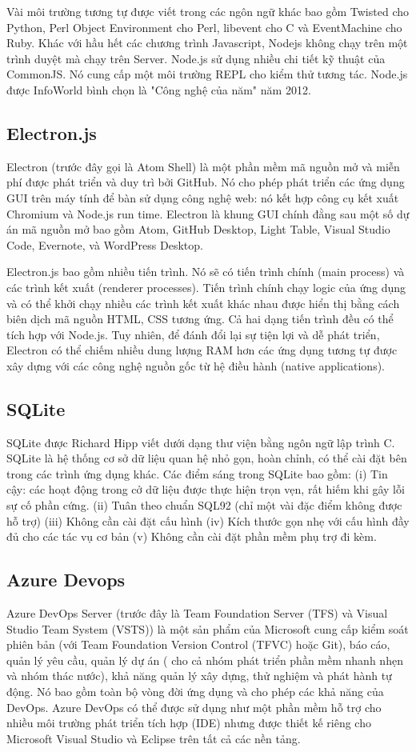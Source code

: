 \documentclass[12pt]{report}
\begin{document}
Vài môi trường tương tự được viết trong các ngôn ngữ khác bao gồm Twisted cho Python, Perl Object Environment cho Perl, libevent cho C và EventMachine cho Ruby. Khác với hầu hết các chương trình Javascript, Nodejs không chạy trên một trình duyệt mà chạy trên Server. Node.js sử dụng nhiều chi tiết kỹ thuật của CommonJS. Nó cung cấp một môi trường REPL cho kiểm thử tương tác. Node.js được InfoWorld bình chọn là "Công nghệ của năm" năm 2012.
\subsection{Electron.js}
Electron (trước đây gọi là Atom Shell) là một phần mềm mã nguồn mở và miễn phí được phát triển và duy trì bởi GitHub. Nó cho phép phát triển các ứng dụng GUI trên máy tính để bàn sử dụng công nghệ web: nó kết hợp công cụ kết xuất Chromium và Node.js run time. Electron là khung GUI chính đằng sau một số dự án mã nguồn mở bao gồm Atom, GitHub Desktop, Light Table, Visual Studio Code, Evernote, và WordPress Desktop.

Electron.js bao gồm nhiều tiến trình. Nó sẽ có tiến trình chính (main process) và các trình kết xuất (renderer processes). Tiến trình chính chạy logic của ứng dụng và có thể khởi chạy nhiều các trình kết xuất khác nhau được hiển thị bằng cách biên dịch mã nguồn HTML, CSS tương ứng. Cả hai dạng tiến trình đều có thể tích hợp với Node.js.
Tuy nhiên, để đánh đổi lại sự tiện lợi và dễ phát triển, Electron có thể chiếm nhiều dung lượng RAM hơn các ứng dụng tương tự được xây dựng với các công nghệ nguồn gốc từ hệ điều hành (native applications).
\subsection{SQLite}
SQLite được Richard Hipp viết dưới dạng thư viện bằng ngôn ngữ lập trình C. SQLite là hệ thống cơ sở dữ liệu quan hệ nhỏ gọn, hoàn chỉnh, có thể cài đặt bên trong các trình ứng dụng khác. Các điểm sáng trong SQLite bao gồm: (i) Tin cậy: các hoạt động trong cở dữ liệu được thực hiện trọn vẹn, rất hiếm khi gây lỗi sự cố phần cứng. (ii) Tuân theo chuẩn SQL92 (chỉ một vài đặc điểm không được hỗ trợ) (iii) Không cần cài đặt cấu hình (iv) Kích thước gọn nhẹ với cấu hình đầy đủ cho các tác vụ cơ bản (v) Không cần cài đặt phần mềm phụ trợ đi kèm.
\subsection{Azure Devops}
Azure DevOps Server (trước đây là Team Foundation Server (TFS) và Visual Studio Team System (VSTS)) là một sản phẩm của Microsoft cung cấp kiểm soát phiên bản (với Team Foundation Version Control (TFVC) hoặc Git), báo cáo, quản lý yêu cầu, quản lý dự án ( cho cả nhóm phát triển phần mềm nhanh nhẹn và nhóm thác nước), khả năng quản lý xây dựng, thử nghiệm và phát hành tự động. Nó bao gồm toàn bộ vòng đời ứng dụng và cho phép các khả năng của DevOps. Azure DevOps có thể được sử dụng như một phần mềm hỗ trợ cho nhiều môi trường phát triển tích hợp (IDE) nhưng được thiết kế riêng cho Microsoft Visual Studio và Eclipse trên tất cả các nền tảng. 
\end{document}
